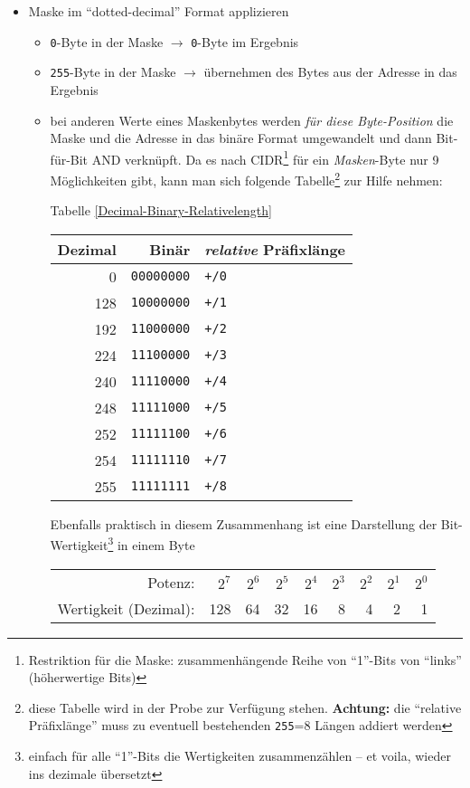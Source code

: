 \documentclass[a4paper,german]{scrartcl}
\begin{document}
\begin{itemize}
  \item Maske im ``dotted-decimal'' Format applizieren
    \begin{itemize}
      \item \texttt{0}-Byte in der Maske $\rightarrow$ \texttt{0}-Byte im Ergebnis
      \item \texttt{255}-Byte in der Maske $\rightarrow$ \"ubernehmen des Bytes aus der Adresse in das Ergebnis
      \item bei anderen Werte eines Maskenbytes werden \emph{f\"ur diese Byte-Position} die Maske und die Adresse in das bin\"are Format umgewandelt und dann Bit-f\"ur-Bit AND verkn\"upft. Da es nach CIDR\footnote{Restriktion f\"ur die Maske: zusammenh\"angende Reihe von ``1''-Bits von ``links'' (h\"oherwertige Bits)} f\"ur ein \emph{Masken}-Byte nur 9 M\"oglichkeiten gibt, kann man sich folgende Tabelle\footnote{diese Tabelle wird in der Probe zur Verf\"ugung stehen. {\bfseries Achtung:} die ``relative Pr\"afixl\"ange'' muss zu eventuell bestehenden \texttt{255}=8 L\"angen addiert werden} zur Hilfe nehmen:
        \begin{center}
          Tabelle \ref{Decimal-Binary-Relativelength}
          \begin{tabular}{rrl}
                    \label{Decimal-Binary-Relativelength}

            \bfseries{Dezimal} & \bfseries{Bin\"ar} & \bfseries{\emph{relative} Pr\"afixl\"ange} \\
            \hline
0   & \texttt{00000000} & \texttt{+/0} \\
128 & \texttt{10000000} & \texttt{+/1} \\
192 & \texttt{11000000} & \texttt{+/2} \\
224 & \texttt{11100000} & \texttt{+/3} \\
240 & \texttt{11110000} & \texttt{+/4} \\
248 & \texttt{11111000} & \texttt{+/5} \\
252 & \texttt{11111100} & \texttt{+/6} \\
254 & \texttt{11111110} & \texttt{+/7} \\
255 & \texttt{11111111} & \texttt{+/8} \\
          \end{tabular}
        \end{center}
        
        Ebenfalls praktisch in diesem Zusammenhang ist eine Darstellung der Bit-Wertigkeit\footnote{einfach f\"ur alle ``1''-Bits die Wertigkeiten zusammenz\"ahlen -- et voila, wieder ins dezimale \"ubersetzt} in einem Byte
        \begin{center}
          \begin{tabular}{r|r|r|r|r|r|r|r|r|}
            Potenz: & $2^{7}$ & $2^{6}$ & $2^{5}$ & $2^{4}$ & $2^{3}$ & $2^{2}$ & $2^{1}$ & $2^{0}$ \\
            Wertigkeit (Dezimal): & 128 & 64 & 32 & 16 & 8 & 4 & 2 & 1 \\
          \end{tabular}
        \end{center}
      \vspace{0.5cm}
        


\end{itemize}
\end{itemize}
\end{document}
